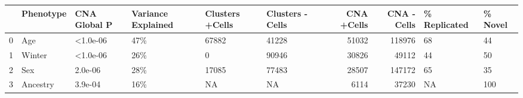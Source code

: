 \begin{tabular}{llllllrrll}
\toprule
{} & Phenotype & CNA Global P & Variance Explained & Clusters +Cells & Clusters -Cells &  CNA +Cells &  CNA -Cells & \% Replicated & \% Novel \\
\midrule
0 &       Age &     <1.0e-06 &                47\% &           67882 &           41228 &       51032 &      118976 &           68 &      44 \\
1 &    Winter &     <1.0e-06 &                26\% &               0 &           90946 &       30826 &       49112 &           44 &      50 \\
2 &       Sex &      2.0e-06 &                28\% &           17085 &           77483 &       28507 &      147172 &           65 &      35 \\
3 &  Ancestry &      3.9e-04 &                16\% &              NA &              NA &        6114 &       37230 &           NA &     100 \\
\bottomrule
\end{tabular}
